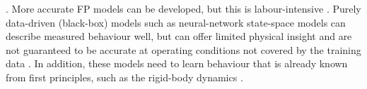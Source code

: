\cite{willard2020integrating}.
More accurate FP models can be developed, but this is labour-intensive
\cite{hoekstra2026lfr}.
\add[M-p2d]{}Purely data-driven (black-box) models such as neural-network state-space models
can describe measured behaviour well, but can offer limited physical
insight and are not guaranteed to be
accurate at operating conditions not covered
by the training data \cite{willard2020integrating, hoekstra2026lfr}.
%
In addition, these models need to learn behaviour that is already known
from first principles, such as the rigid-body dynamics
\cite{hoekstra2026lfr}.


